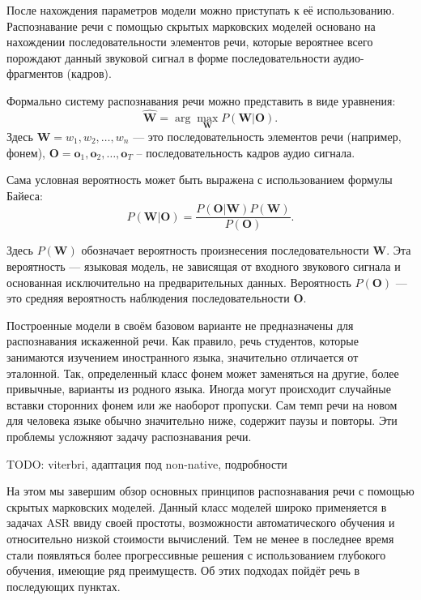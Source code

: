 После нахождения параметров модели можно приступать к её использованию. Распознавание речи с помощью скрытых марковских моделей основано на нахождении последовательности элементов речи, которые вероятнее всего порождают данный звуковой сигнал в форме последовательности аудио-фрагментов (кадров).

Формально систему распознавания речи можно представить в виде уравнения:
$$\mathbf{\hat{W}} = \operatorname{arg} \max_\mathbf{W} P(\mathbf{W} | \mathbf{O}).$$
Здесь $\mathbf{W} = w_1, w_2, \dots, w_n$ --- это последовательность элементов речи (например, фонем), $\mathbf{O} = \mathbf{o}_1, \mathbf{o}_2, \dots, \mathbf{o}_T$ -- последовательность кадров аудио сигнала.

Сама условная вероятность может быть выражена с использованием формулы Байеса:
$$P(\mathbf{W}|\mathbf{O}) = \frac{P(\mathbf{O}|\mathbf{W})P(\mathbf{W})}{P(\mathbf{O})}.$$

Здесь $P(\mathbf{W})$ обозначает вероятность произнесения последовательности $\mathbf{W}$. Эта вероятность --- языковая модель, не зависящая от входного звукового сигнала и основанная исключительно на предварительных данных. Вероятность $P(\mathbf{O})$ --- это средняя вероятность наблюдения последовательности $\mathbf{O}$.

Построенные модели в своём базовом варианте не предназначены для распознавания искаженной речи. Как правило, речь студентов, которые занимаются изучением иностранного языка, значительно отличается от эталонной. Так, определенный класс фонем может заменяться на другие, более привычные, варианты из родного языка. Иногда могут происходит случайные вставки сторонних фонем или же наоборот пропуски. Сам темп речи на новом для человека языке обычно значительно ниже, содержит паузы и повторы. Эти проблемы усложняют задачу распознавания речи.

{\color{red}TODO: viterbri, адаптация под non-native, подробности}

На этом мы завершим обзор основных принципов распознавания речи с помощью скрытых марковских моделей. Данный класс моделей широко применяется в задачах ASR ввиду своей простоты, возможности автоматического обучения и относительно низкой стоимости вычислений. Тем не менее в последнее время стали появляться более прогрессивные решения с использованием глубокого обучения, имеющие ряд преимуществ. Об этих подходах пойдёт речь в последующих пунктах.

